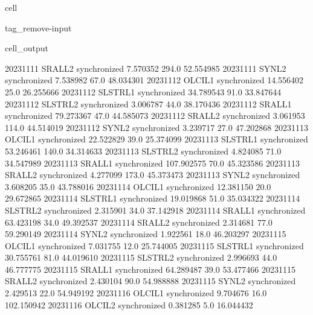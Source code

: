 \documentclass[letterpaper,10pt,english]{jupyterBook}
\begin{document}
\begin{sphinxuseclass}{cell}
\begin{sphinxuseclass}{tag_remove-input}
\begin{sphinxVerbatimOutput}
\begin{sphinxuseclass}{cell_output}
\begin{sphinxVerbatim}[commandchars=\\\{\}]
2023\PYGZhy{}11\PYGZhy{}11      SRAL\PYGZus{}L2  synchronized    7.570352   294.0   52.554985
2023\PYGZhy{}11\PYGZhy{}11       SYN\PYGZus{}L2  synchronized    7.538982    67.0   48.034301
2023\PYGZhy{}11\PYGZhy{}12      OLCI\PYGZus{}L1  synchronized   14.556402    25.0   26.255666
2023\PYGZhy{}11\PYGZhy{}12     SLSTR\PYGZus{}L1  synchronized   34.789543    91.0   33.847644
2023\PYGZhy{}11\PYGZhy{}12     SLSTR\PYGZus{}L2  synchronized    3.006787    44.0   38.170436
2023\PYGZhy{}11\PYGZhy{}12      SRAL\PYGZus{}L1  synchronized   79.273367    47.0   44.585073
2023\PYGZhy{}11\PYGZhy{}12      SRAL\PYGZus{}L2  synchronized    3.061953   114.0   44.514019
2023\PYGZhy{}11\PYGZhy{}12       SYN\PYGZus{}L2  synchronized    3.239717    27.0   47.202868
2023\PYGZhy{}11\PYGZhy{}13      OLCI\PYGZus{}L1  synchronized   22.522829    39.0   25.374099
2023\PYGZhy{}11\PYGZhy{}13     SLSTR\PYGZus{}L1  synchronized   53.246461   140.0   34.314633
2023\PYGZhy{}11\PYGZhy{}13     SLSTR\PYGZus{}L2  synchronized    4.824085    71.0   34.547989
2023\PYGZhy{}11\PYGZhy{}13      SRAL\PYGZus{}L1  synchronized  107.902575    70.0   45.323586
2023\PYGZhy{}11\PYGZhy{}13      SRAL\PYGZus{}L2  synchronized    4.277099   173.0   45.373473
2023\PYGZhy{}11\PYGZhy{}13       SYN\PYGZus{}L2  synchronized    3.608205    35.0   43.788016
2023\PYGZhy{}11\PYGZhy{}14      OLCI\PYGZus{}L1  synchronized   12.381150    20.0   29.672865
2023\PYGZhy{}11\PYGZhy{}14     SLSTR\PYGZus{}L1  synchronized   19.019868    51.0   35.034322
2023\PYGZhy{}11\PYGZhy{}14     SLSTR\PYGZus{}L2  synchronized    2.315901    34.0   37.142918
2023\PYGZhy{}11\PYGZhy{}14      SRAL\PYGZus{}L1  synchronized   63.423198    34.0   49.392537
2023\PYGZhy{}11\PYGZhy{}14      SRAL\PYGZus{}L2  synchronized    2.314681    77.0   59.290149
2023\PYGZhy{}11\PYGZhy{}14       SYN\PYGZus{}L2  synchronized    1.922561    18.0   46.203297
2023\PYGZhy{}11\PYGZhy{}15      OLCI\PYGZus{}L1  synchronized    7.031755    12.0   25.744005
2023\PYGZhy{}11\PYGZhy{}15     SLSTR\PYGZus{}L1  synchronized   30.755761    81.0   44.019610
2023\PYGZhy{}11\PYGZhy{}15     SLSTR\PYGZus{}L2  synchronized    2.996693    44.0   46.777775
2023\PYGZhy{}11\PYGZhy{}15      SRAL\PYGZus{}L1  synchronized   64.289487    39.0   53.477466
2023\PYGZhy{}11\PYGZhy{}15      SRAL\PYGZus{}L2  synchronized    2.430104    90.0   54.988888
2023\PYGZhy{}11\PYGZhy{}15       SYN\PYGZus{}L2  synchronized    2.429513    22.0   54.949192
2023\PYGZhy{}11\PYGZhy{}16      OLCI\PYGZus{}L1  synchronized    9.704676    16.0  102.150942
2023\PYGZhy{}11\PYGZhy{}16      OLCI\PYGZus{}L2  synchronized    0.381285     5.0   16.044432

\end{sphinxVerbatim}
\end{sphinxuseclass}
\end{sphinxVerbatimOutput}
\end{sphinxuseclass}
\end{sphinxuseclass}
\end{document}
